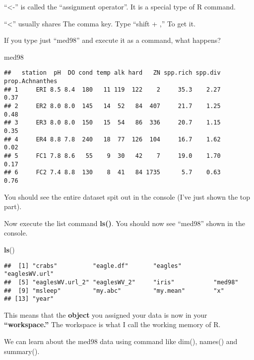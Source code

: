 \documentclass[]{book}
\newenvironment{Shaded}{\begin{snugshade}}{\end{snugshade}}
\newcommand{\KeywordTok}[1]{\textcolor[rgb]{0.13,0.29,0.53}{\textbf{#1}}}
\newcommand{\NormalTok}[1]{#1}
\theoremstyle{definition}
\theoremstyle{definition}
\theoremstyle{definition}
\theoremstyle{remark}
\begin{document}
``\textless{}-'' is called the ``assignment operator''. It is a special
type of R command.

``\textless{}'' usually shares The comma key. Type ``shift + ,'' To get
it.

If you type just ``med98'' and execute it as a command, what happens?

\begin{Shaded}
\begin{Highlighting}[]
\NormalTok{med98}
\end{Highlighting}
\end{Shaded}

\begin{verbatim}
##   station  pH  DO cond temp alk hard   ZN spp.rich spp.div prop.Achnanthes
## 1     ERI 8.5 8.4  180   11 119  122    2     35.3    2.27            0.37
## 2     ER2 8.0 8.0  145   14  52   84  407     21.7    1.25            0.48
## 3     ER3 8.0 8.0  150   15  54   86  336     20.7    1.15            0.35
## 4     ER4 8.8 7.8  240   18  77  126  104     16.7    1.62            0.02
## 5     FC1 7.8 8.6   55    9  30   42    7     19.0    1.70            0.17
## 6     FC2 7.4 8.8  130    8  41   84 1735      5.7    0.63            0.76
\end{verbatim}

You should see the entire dataset spit out in the console (I've just
shown the top part).

Now execute the list command \textbf{ls()}. You should now see ``med98''
shown in the console.

\begin{Shaded}
\begin{Highlighting}[]
\KeywordTok{ls}\NormalTok{()}
\end{Highlighting}
\end{Shaded}

\begin{verbatim}
##  [1] "crabs"          "eagle.df"       "eagles"         "eaglesWV.url"  
##  [5] "eaglesWV.url_2" "eaglesWV_2"     "iris"           "med98"         
##  [9] "msleep"         "my.abc"         "my.mean"        "x"             
## [13] "year"
\end{verbatim}

This means that the \textbf{object} you assigned your data is now in
your \textbf{``workspace.''} The workspace is what I call the working
memory of R.

We can learn about the med98 data using command like dim(), names() and
summary().
\end{document}
